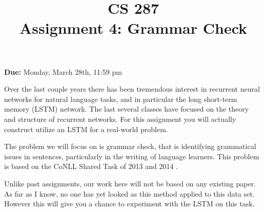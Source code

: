 \documentclass[11pt]{article}
\title{CS 287 \\ Assignment 4: Grammar Check}
\date{}
\begin{document}
\maketitle{}

\begin{center}
  \textbf{Due:} Monday, March 28th, 11:59 pm 
\end{center}


Over the last couple years there has been tremendous interest in
recurrent neural networks for natural language tasks, and in
particular the long short-term memory (LSTM) network. The last 
several classes have focused on the theory and structure of 
recurrent networks. For this assignment you will actually 
construct utilize an LSTM for a real-world problem. 

The problem we will focus on is grammar check, that is identifying
grammatical issues in sentences, particularly in the writing of
language learners. This problem is based on the CoNLL Shared Task 
of 2013 and 2014 \cite{}. 

Unlike past assignments, our work here will not be based on any
existing paper. As far as I know, no one has yet looked as this 
method applied to this data set. However this will give you a chance 
to experiment with the LSTM on this task. 




\end{document}

